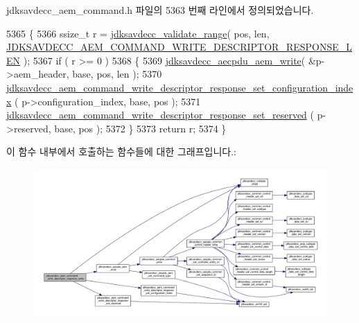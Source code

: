 jdksavdecc\+\_\+aem\+\_\+command.\+h 파일의 5363 번째 라인에서 정의되었습니다.


\begin{DoxyCode}
5365 \{
5366     ssize\_t r = \hyperlink{group__util_ga9c02bdfe76c69163647c3196db7a73a1}{jdksavdecc\_validate\_range}( pos, len, 
      \hyperlink{group__command__write__descriptor__response_ga0a9e23ef31c7afb4b787aa81e7a61f4c}{JDKSAVDECC\_AEM\_COMMAND\_WRITE\_DESCRIPTOR\_RESPONSE\_LEN} );
5367     \textcolor{keywordflow}{if} ( r >= 0 )
5368     \{
5369         \hyperlink{group__aecpdu__aem_gad658e55771cce77cecf7aae91e1dcbc5}{jdksavdecc\_aecpdu\_aem\_write}( &p->aem\_header, base, pos, len );
5370         \hyperlink{group__command__write__descriptor__response_ga988a0b4318975f1903a080f40910a62e}{jdksavdecc\_aem\_command\_write\_descriptor\_response\_set\_configuration\_index}
      ( p->configuration\_index, base, pos );
5371         \hyperlink{group__command__write__descriptor__response_gafb44a904aa2a01b7b62f5edfeff12ac0}{jdksavdecc\_aem\_command\_write\_descriptor\_response\_set\_reserved}
      ( p->reserved, base, pos );
5372     \}
5373     \textcolor{keywordflow}{return} r;
5374 \}
\end{DoxyCode}


이 함수 내부에서 호출하는 함수들에 대한 그래프입니다.\+:
\nopagebreak
\begin{figure}[H]
\begin{center}
\leavevmode
\includegraphics[width=350pt]{group__command__write__descriptor__response_ga7b15df90ad2faa62a9d732c5ba5b94d4_cgraph}
\end{center}
\end{figure}


